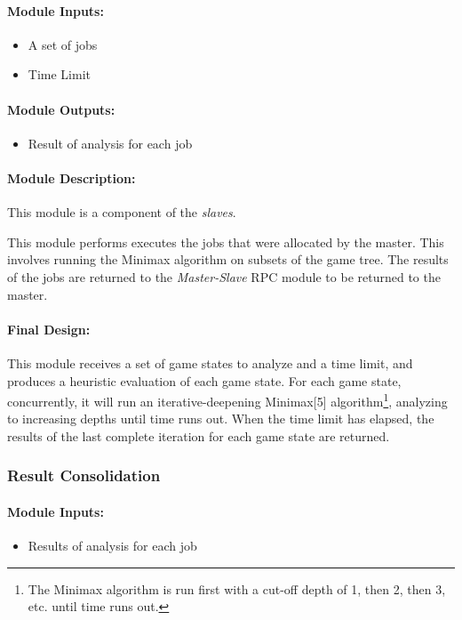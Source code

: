 \documentclass[pdftex,12pt,a4paper]{article}
\begin{document}
\paragraph{Module Inputs:}
\begin{itemize}
\item A set of jobs
\item Time Limit
\end{itemize}

\paragraph{Module Outputs:}
\begin{itemize}
\item Result of analysis for each job
\end{itemize}

\paragraph{Module Description:\\}
This module is a component of the \emph{slaves}.

This module performs executes the jobs that were allocated by the master. This involves running the Minimax algorithm on subsets of the game tree. The results of the jobs are returned to the \emph{Master-Slave} RPC module to be returned to the master.

\paragraph{Final Design:\\}
This module receives a set of game states to analyze and a time limit, and produces a heuristic evaluation of each game state. For each game state, concurrently, it will run an iterative-deepening Minimax[5] algorithm\footnote{The Minimax algorithm is run first with a cut-off depth of 1, then 2, then 3, etc. until time runs out.}, analyzing to increasing depths until time runs out. When the time limit has elapsed, the results of the last complete iteration for each game state are returned.


\subsubsection{Result Consolidation}

\paragraph{Module Inputs:}
\begin{itemize}
\item Results of analysis for each job
\end{itemize}
\end{document}

